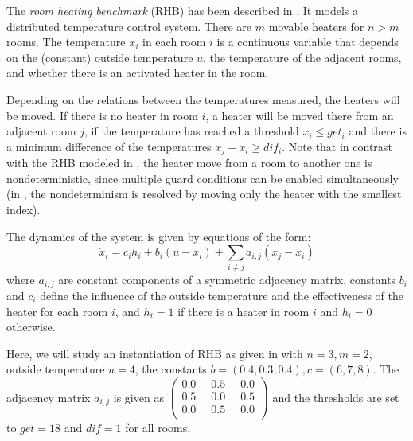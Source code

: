 \documentclass{llncs}
\begin{document}
\begin{example} \label{ex:rhb}
The \emph{room heating benchmark} (RHB) has been described in
\cite{FI:2004}. It models a distributed temperature control
system. There are $m$ movable heaters for $n > m$ rooms. The
temperature $x_i$ in each room $i$ is a continuous variable that
depends on the (constant) outside temperature $u$, the temperature of
the adjacent rooms, and whether there is an activated heater in the
room.

Depending on the relations between the temperatures measured,
the heaters will be moved. If there is no heater in room $i$, a heater
will be moved there from an adjacent room $j$, if the temperature has
reached a threshold $x_i \leq get_i$ and there is a minimum difference
of the temperatures $x_j - x_i \geq dif_i$.  Note that in contrast
with the RHB modeled in \cite{AKRS:2008}, the heater move from a room
to another one is nondeterministic, since multiple guard conditions
can be enabled simultaneously (in \cite{AKRS:2008}, the nondeterminism
is resolved by moving only the heater with the smallest index).

The dynamics of the system is given by equations of the form:
\begin{equation}\label{eq:rhb}
  \dot{x}_i = c_i h_i + b_i (u - x_i) + \sum \limits_{i\neq j} a_{i,j}(x_j - x_i)
\end{equation}
where $a_{i,j}$ are constant components of a symmetric adjacency
matrix, constants $b_i$ and $c_i$ define the influence of the outside
temperature and the effectiveness of the heater for each room $i$, and
$h_i = 1$ if there is a heater in room $i$ and $h_i = 0$ otherwise.

Here, we will study an instantiation of RHB as given in
\cite{AKRS:2008} with $n=3, m=2$, outside temperature $u=4$, the
constants $b = (0.4, 0.3, 0.4), c = (6,7,8)$. The adjacency matrix
$a_{i,j}$ is given as $\left(\begin{smallmatrix}
      0.0 \;\; & 0.5 & \;\; 0.0 \\
      0.5 \;\; & 0.0 & \;\; 0.5 \\
      0.0 \;\; & 0.5 & \;\; 0.0 \\
\end{smallmatrix}\right)$
and the thresholds are set to $get = 18$ and $dif = 1$ for all rooms.

\begin{figure}[tb]
  \centering
  \footnotesize
  \begin{tikzpicture}[->,>=stealth']


\end{tikzpicture}
\end{figure}
\end{example}
\end{document}
